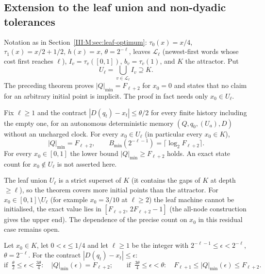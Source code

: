 \subsection{Extension to the leaf union and non-dyadic tolerances}\label{III:M:rev13:sec:fib}

Notation as in Section~\ref{III:M:sec:leaf-optimum}: $\tau_0(x)=x/4$, $\tau_1(x)=x/2+1/2$, $h(x)=x$, $\theta=2^{-\ell}$, leaves
$\mathcal L_\ell$ (newest-first words whose cost first reaches $\ell$),
$I_v=\tau_v([0,1])$, $b_v=\tau_v(1)$, and $K$ the attractor. Put
\[
U_\ell=\bigcup_{v\in\mathcal L_\ell}I_v\supseteq K .
\]
The preceding theorem proves $|Q|_{\min}=F_{\ell+2}$ for $x_0=0$ and states that no claim for an
arbitrary initial point is implicit. The proof in fact needs only $x_0\in U_\ell$.

\begin{theorem}
\label{III:M:rev13:thm:fib-general}
Fix $\ell\ge1$ and the contract $|D(q_t)-x_t|\le\theta/2$ for every finite history
including the empty one, for an autonomous deterministic memory $(Q,q_0,(U_a),D)$ without
an uncharged clock. For every $x_0\in U_\ell$ (in particular every $x_0\in K$),
\[
|Q|_{\min}=F_{\ell+2},\qquad B_{\min}(2^{-\ell-1})=\lceil\log_2F_{\ell+2}\rceil .
\]
For every $x_0\in[0,1]$ the lower bound $|Q|_{\min}\ge F_{\ell+2}$ holds. An exact state count for $x_0\notin U_\ell$ is not asserted here.
\end{theorem}


\begin{remark}
The leaf union $U_\ell$ is a strict superset of $K$ (it contains the gaps of $K$ at
depth $\ge\ell$), so the theorem covers more initial points than the attractor. For
$x_0\in[0,1]\setminus U_\ell$ (for example $x_0=3/10$ at $\ell\ge2$) the leaf machine
cannot be initialised, the exact value lies in $[F_{\ell+2},\,2F_{\ell+2}-1]$ (the
all-node construction gives the upper end). The dependence of the precise
count on $x_0$ in this residual case remains open.
\end{remark}

\begin{proposition}\label{III:M:rev13:prop:fib-eps}
Let $x_0\in K$, let $0<\epsilon\le1/4$ and let $\ell\ge1$ be the integer with
$2^{-\ell-1}\le\epsilon<2^{-\ell}$, $\theta=2^{-\ell}$. For the contract
$|D(q_t)-x_t|\le\epsilon$:
\[
\text{if }\ \tfrac\theta2\le\epsilon<\tfrac{3\theta}4:\quad |Q|_{\min}(\epsilon)=F_{\ell+2};
\qquad
\text{if }\ \tfrac{3\theta}4\le\epsilon<\theta:\quad F_{\ell+1}\le|Q|_{\min}(\epsilon)\le F_{\ell+2}.
\]
\end{proposition}


